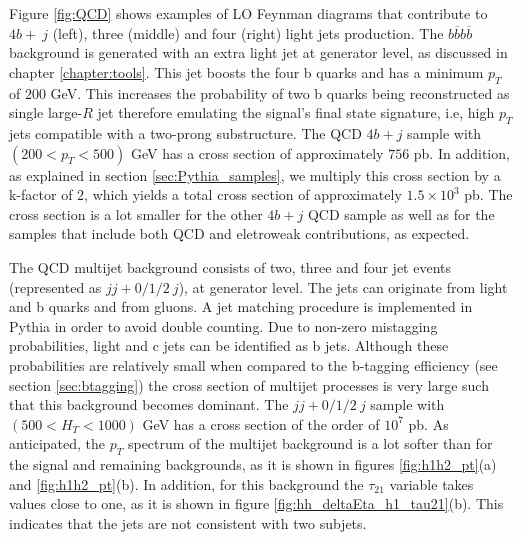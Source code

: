 Figure \ref{fig:QCD} shows examples of LO Feynman diagrams that contribute to $4b+~j$ (left), three (middle) and four (right) light jets production. The $b\overline{b}b\overline{b}$ background is generated with an extra light jet at generator level, as discussed in chapter \ref{chapter:tools}. This jet boosts the four b quarks and has a minimum $p_T$ of $200$ GeV. This increases the probability of two b quarks being reconstructed as single large-$R$ jet therefore emulating the signal's final state signature, i.e, high $p_T$ jets compatible with a two-prong substructure. The QCD $4b+j$ sample with $(200<p_T<500)$ GeV has a cross section of approximately $756$ pb. In addition, as explained in section \ref{sec:Pythia_samples}, we multiply this cross section by a k-factor of $2$, which yields a total cross section of approximately $1.5\times 10^{3}$ pb. The cross section is a lot smaller for the other $4b+j$ QCD sample as well as for the samples that include both QCD and eletroweak contributions, as expected.

The QCD multijet background consists of two, three and four jet events (represented as $jj+0/1/2 ~j$), at generator level. The jets can originate from light and b quarks and from gluons. A jet matching procedure is implemented in Pythia in order to avoid double counting. Due to non-zero mistagging probabilities, light and c jets can be identified as b jets. Although these probabilities are relatively small when compared to the b-tagging efficiency (see section \ref{sec:btagging}) the cross section of multijet processes is very large such that this background becomes dominant. The $jj+0/1/2 ~j$ sample with $(500<H_T<1000)$ GeV has a cross section of the order of $10^7$ pb. As anticipated, the $p_T$ spectrum of the multijet background is a lot softer than for the signal and remaining backgrounds, as it is shown in figures \ref{fig:h1h2_pt}(a) and \ref{fig:h1h2_pt}(b). In addition, for this background the $\tau_{21}$ variable takes values close to one, as it is shown in figure \ref{fig:hh_deltaEta_h1_tau21}(b). This indicates that the jets are not consistent with two subjets. 

